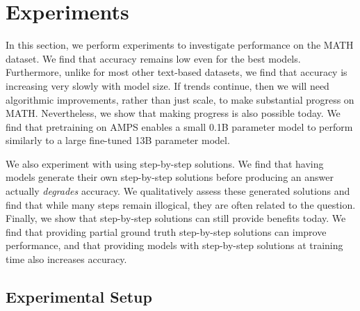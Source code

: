 \documentclass{article}
\begin{document}
 
\section{Experiments}


In this section, we perform experiments to investigate performance on the MATH dataset. 
We find that accuracy remains low even for the best models. Furthermore, unlike for most other text-based datasets, we find that accuracy is increasing very slowly with model size. If trends continue, then we will need algorithmic improvements, rather than just scale, to make substantial progress on MATH. Nevertheless, we show that making progress is also possible today. We find that pretraining on AMPS enables a small 0.1B parameter model to perform similarly to a large fine-tuned 13B parameter model. 

We also experiment with using step-by-step solutions. We find that having models generate their own step-by-step solutions before producing an answer actually \emph{degrades} accuracy. We qualitatively assess these generated solutions and find that while many steps remain illogical, they are often related to the question. Finally, we show that step-by-step solutions can still provide benefits today. We find that providing partial ground truth step-by-step solutions can improve performance, and that providing models with step-by-step solutions at training time also increases accuracy.

\subsection{Experimental Setup} 
\end{document}
